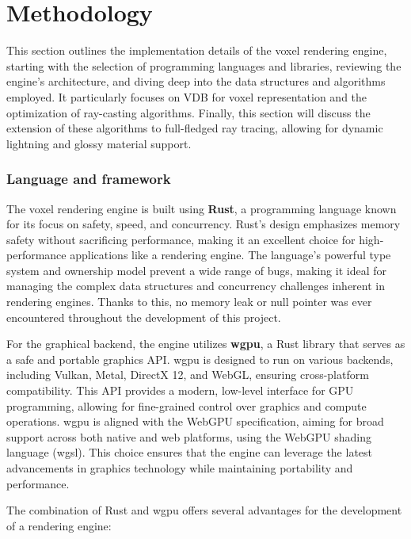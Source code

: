 
\part{Methodology}\label{methodology}
This section outlines the implementation details of the voxel rendering engine, starting with the selection of programming languages and libraries, reviewing the engine's architecture, and diving deep into the data structures and algorithms employed. It particularly focuses on VDB for voxel representation and the optimization of ray-casting algorithms.
Finally, this section will discuss the extension of these algorithms to full-fledged ray tracing, allowing for dynamic lightning and glossy material support.

\section{Language and framework}

The voxel rendering engine is built using \textbf{Rust}, a programming language known for its focus on safety, speed, and concurrency\supercite{rustbook}.
Rust's design emphasizes memory safety without sacrificing performance, making it an excellent choice for high-performance applications like a rendering engine.
The language's powerful type system and ownership model prevent a wide range of bugs, making it ideal for managing the complex data structures and concurrency challenges inherent in rendering engines. Thanks to this, no memory leak or null pointer was ever encountered throughout the development of this project.

For the graphical backend, the engine utilizes \textbf{wgpu}\supercite{wgpu:doc}, a Rust library that serves as a safe and portable graphics API. wgpu is designed to run on various backends, including Vulkan, Metal, DirectX 12, and WebGL, ensuring cross-platform compatibility. This API provides a modern, low-level interface for GPU programming, allowing for fine-grained control over graphics and compute operations. wgpu is aligned with the WebGPU specification\supercite{webgpu:doc}, aiming for broad support across both native and web platforms, using the WebGPU shading language (wgsl)\supercite{wgsl:doc}. This choice ensures that the engine can leverage the latest advancements in graphics technology while maintaining portability and performance.

The combination of Rust and wgpu offers several advantages for the development of a rendering engine:

